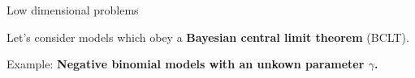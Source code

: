 
\begin{frame}[t]{Low dimensional problems}

Let's consider models which obey a \textbf{Bayesian central limit theorem} (BCLT).

Example: \textbf{Negative binomial models with an unkown parameter
$\gamma$.}

%


%


\end{frame}
